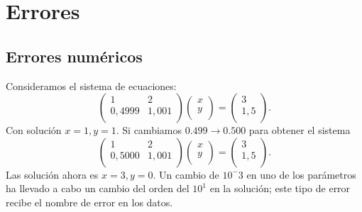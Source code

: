 \chapter{Errores}

\section{Errores numéricos}
	
\begin{example}\label{ej:1_errores}
    Consideramos el sistema de ecuaciones:
    \[
        \begin{pmatrix}
            1 & 2\\
            0,4999 & 1,001\\
        \end{pmatrix}
        \begin{pmatrix}
        x\\
        y\\
        \end{pmatrix} =
        \begin{pmatrix}
        3\\
        1,5\\
        \end{pmatrix}.
    \]
    Con solución $x = 1, y = 1$. Si cambiamos $0.499 \rightarrow 0.500$ para obtener el sistema
    \[
        \begin{pmatrix}
            1 & 2\\
            0,5000 & 1,001\\
        \end{pmatrix}
        \begin{pmatrix}
        x\\
        y\\
        \end{pmatrix} =
        \begin{pmatrix}
        3\\
        1,5\\
        \end{pmatrix}.
    \]
    Las solución ahora es $x = 3, y = 0$. Un cambio de $10^-3$ en uno de los parámetros ha llevado a cabo un cambio del orden del $10^1$ en la solución; este tipo de error recibe el nombre de error en los datos.
\end{example}

